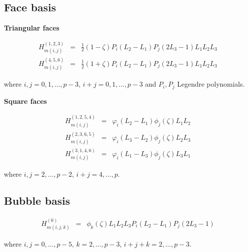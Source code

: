 \subsection{Face basis}

\noindent \textbf{Triangular faces}

\begin{eqnarray*}
H_{m(i,j)}^{(1,2,3)}&=&\frac{1}{2}(1-\zeta) P_i(L_2-L_1)
P_j(2L_3-1)L_1L_2L_3 \\
H_{m(i,j)}^{(4,5,6)}&=&\frac{1}{2}(1+\zeta) P_i(L_2-L_1)
P_j(2L_3-1)L_1L_2L_3
\end{eqnarray*}

\noindent where $i,j=0,1,\ldots,p-3$, $i+j=0,1,\ldots,p-3$ and
$P_i,P_j$ Legendre polynomials.

\noindent \textbf{Square faces}

\begin{eqnarray*}
H_{m(i,j)}^{(1,2,5,4)}&=&\varphi_i(L_2-L_1)\phi_j(\zeta)L_1L_2 \\
H_{m(i,j)}^{(2,3,6,5)}&=&\varphi_i(L_3-L_2)\phi_j(\zeta)L_2L_3 \\
H_{m(i,j)}^{(3,1,4,6)}&=&\varphi_i(L_1-L_3)\phi_j(\zeta)L_3L_1
\end{eqnarray*}

\noindent where $i,j=2,\ldots,p-2$, $i+j=4,\ldots,p$.

\subsection{Bubble basis}

\begin{eqnarray*}
H_{m(i,j,k)}^{(0)}&=&\phi_k(\zeta)L_1L_2L_3 P_i(L_2-L_1) P_j(2L_3-1)
\end{eqnarray*}

\noindent where $i,j=0,\ldots,p-5$, $k=2,\ldots,p-3$,
$i+j+k=2,\ldots,p-3$.



% 


